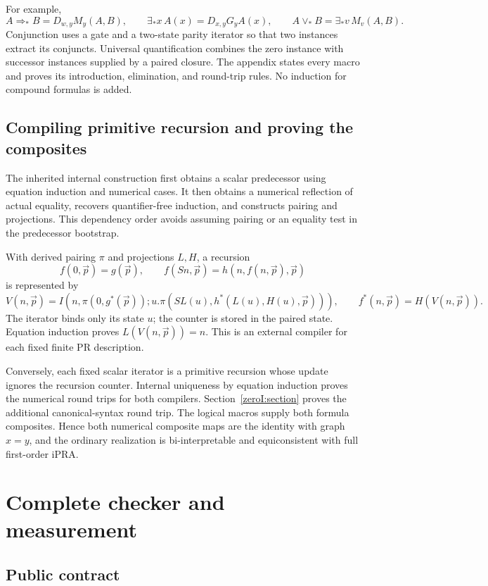 \documentclass[11pt,a4paper]{article}
\theoremstyle{definition}
\begin{document}
For example,
\[
 A\Rightarrow_*B=D_{w,y}M_y(A,B),\qquad
 \exists_*x\,A(x)=D_{x,y}G_yA(x),\qquad
 A\vee_*B=\exists_*v\,M_v(A,B).
\]
Conjunction uses a gate and a two-state parity iterator so that two
instances extract its conjuncts. Universal quantification combines the
zero instance with successor instances supplied by a paired closure.
The appendix states every macro and proves its introduction,
elimination, and round-trip rules. No induction for compound formulas
is added.

\subsection{Compiling primitive recursion and proving the composites}

The inherited internal construction first obtains a scalar predecessor
using equation induction and numerical cases. It then obtains a
numerical reflection of actual equality, recovers quantifier-free
induction, and constructs pairing and projections. This dependency
order avoids assuming pairing or an equality test in the predecessor
bootstrap.

With derived pairing \(\pi\) and projections \(L,H\), a recursion
\[
 f(0,\vec p)=g(\vec p),\qquad
 f(Sn,\vec p)=h(n,f(n,\vec p),\vec p)
\]
is represented by
\[
 V(n,\vec p)=I\!\left(n,\pi(0,g^*(\vec p));
 u.\pi(SL(u),h^*(L(u),H(u),\vec p))\right),\qquad
 f^*(n,\vec p)=H(V(n,\vec p)).
\]
The iterator binds only its state \(u\); the counter is stored in the
paired state. Equation induction proves \(L(V(n,\vec p))=n\).
This is an external compiler for each fixed finite PR description.

Conversely, each fixed scalar iterator is a primitive recursion whose
update ignores the recursion counter. Internal uniqueness by equation
induction proves the numerical round trips for both compilers.
Section~\ref{zeroI:section} proves the additional canonical-syntax
round trip. The logical macros supply both formula composites.
Hence both numerical composite maps are the identity with graph \(x=y\),
and the ordinary realization is bi-interpretable and equiconsistent
with full first-order iPRA.

\section{Complete checker and measurement}
\label{sec:implementation}

\subsection{Public contract}
\end{document}
